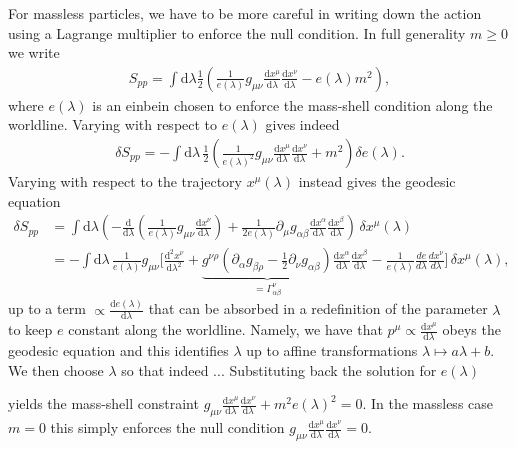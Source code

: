 \documentclass[../geometry_main.tex]{subfiles}
\begin{document}
{\begin{mytheorem}
For massless particles, we have to be more careful in writing down the action using a Lagrange multiplier to enforce the null condition.
In full generality $m\geq 0$ we write
\begin{align}
    S_{pp} = \int \mathrm{d}\lambda \frac{1}{2}\left( \frac{1}{e(\lambda)} g_{\mu\nu} \frac{\mathrm{d}x^\mu}{\mathrm{d}\lambda} \frac{\mathrm{d}x^\nu}{\mathrm{d}\lambda} - e(\lambda) m^2 \right),
\end{align}
where $e(\lambda)$ is an einbein chosen to enforce the mass-shell condition along the worldline.
Varying with respect to $e(\lambda)$ gives indeed
{\small
\begin{align}
    \delta S_{pp} = -\int \mathrm{d}\lambda \, \frac{1}{2} \left( \frac{1}{e(\lambda)^2} g_{\mu\nu} \frac{\mathrm{d}x^\mu}{\mathrm{d}\lambda} \frac{\mathrm{d}x^\nu}{\mathrm{d}\lambda} + m^2 \right) \delta e(\lambda).
\end{align}
}
Varying with respect to the trajectory $x^\mu(\lambda)$ instead gives the geodesic equation
{\small
\begin{align}
    \delta S_{pp} &= \int \mathrm{d}\lambda  \left( - \frac{\mathrm{d}}{\mathrm{d}\lambda} \left( \frac{1}{e(\lambda)} g_{\mu\nu} \frac{\mathrm{d}x^\nu}{\mathrm{d}\lambda} \right) + \frac{1}{2 e(\lambda)} \partial_\mu g_{\alpha\beta} \frac{\mathrm{d}x^\alpha}{\mathrm{d}\lambda} \frac{\mathrm{d}x^\beta}{\mathrm{d}\lambda} \right)\, \delta x^\mu(\lambda)
    \\
    &=-\int \mathrm{d}\lambda \,\frac{1}{e(\lambda)} g_{\mu\nu}\Bigg[ \frac{\mathrm{d}^2 x^\nu}{\mathrm{d}\lambda^2}  + \underbrace{g^{\nu\rho}\left(\partial_\alpha g_{\beta\rho}-\frac{1}{2} \partial_\nu g_{\alpha\beta} \right)}_{=\Gamma_{\alpha\beta}^\nu} \frac{\mathrm{d}x^\alpha}{\mathrm{d}\lambda} \frac{\mathrm{d}x^\beta}{\mathrm{d}\lambda}-\frac{1}{e(\lambda)}\frac{de}{d\lambda}\frac{d x^\nu}{d\lambda}\Bigg]\, \delta x^\mu(\lambda),
\end{align}
}
up to a term $\propto \frac{\mathrm{d}e(\lambda)}{\mathrm{d}\lambda}$ that can be absorbed in a redefinition of the parameter $\lambda$ to keep $e$ constant along the worldline.
Namely, we have that $p^\mu \propto \frac{\mathrm{d}x^\mu}{\mathrm{d}\lambda}$ obeys the geodesic equation and this identifies $\lambda$ up to affine transformations $\lambda \mapsto a \lambda + b$.
We then choose $\lambda$ so that indeed ...
Substituting back the solution for $e(\lambda)$

yields the mass-shell constraint $g_{\mu\nu} \frac{\mathrm{d}x^\mu}{\mathrm{d}\lambda} \frac{\mathrm{d}x^\nu}{\mathrm{d}\lambda} + m^2 e(\lambda)^2 =0$.
In the massless case $m=0$ this simply enforces the null condition $g_{\mu\nu} \frac{\mathrm{d}x^\mu}{\mathrm{d}\lambda} \frac{\mathrm{d}x^\nu}{\mathrm{d}\lambda} =0$. 
\end{mytheorem}

}
\end{document}
